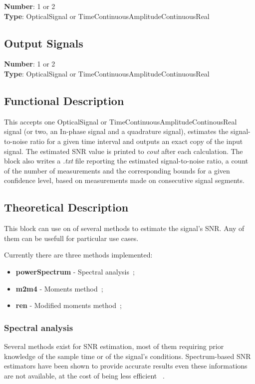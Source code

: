 \begin{refsection}
\textbf{Number}: 1 or 2\\
\textbf{Type}: OpticalSignal or TimeContinuousAmplitudeContinuousReal

\subsection*{Output Signals}

\textbf{Number}: 1 or 2\\
\textbf{Type}: OpticalSignal or TimeContinuousAmplitudeContinuousReal

\subsection*{Functional Description}
This  accepts one OpticalSignal or TimeContinuousAmplitudeContinousReal signal
(or two, an In-phase signal and a quadrature signal), estimates the
signal-to-noise ratio for a given time interval and outputs an exact copy of the
input signal. The estimated SNR value is printed to \textit{cout} after each
calculation.  The block also writes a \textit{.txt} file reporting the estimated
signal-to-noise ratio, a count of the number of measurements and the
corresponding bounds for a given confidence level, based on measurements made on
consecutive signal segments.


\subsection*{Theoretical Description}\label{snrcalc}
This block can use on of several methods to estimate the signal's SNR. Any of
them can be usefull for particular use cases.

Currently there are three methods implemented:

\begin{itemize}
	\item \textbf{powerSpectrum} - Spectral
		analysis~\cite{harris12,xiao10,kashefi12};
	\item \textbf{m2m4} - Moments method~\cite{matzner93};
	\item \textbf{ren} - Modified moments method~\cite{ren05};
\end{itemize}

\subsubsection*{Spectral analysis}
Several methods exist for SNR estimation, most of them requiring prior
knowledge of the sample time or of the signal's conditions. Spectrum-based SNR
estimators have been shown to provide accurate results even these informations
are not available, at the cost of being less efficient ~\cite{harris12,xiao10,kashefi12}. 



\end{refsection}
